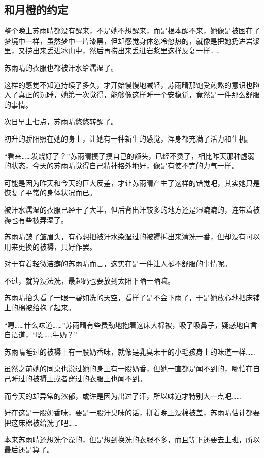 \subsection{和月橙的约定}

整个晚上苏雨晴都没有醒来，不是她不想醒来，而是根本醒不来，她像是被困在了梦境中一样，虽然梦中一片漆黑，但却感觉身体忽冷忽热的，就像是把她扔进岩浆里，又捞出来丢进冰山中，然后再捞出来丢进岩浆里这样反复一样……

苏雨晴的衣服也都被汗水给濡湿了。

这样的感觉不知道持续了多久，才开始慢慢地减轻，苏雨晴那饱受煎熬的意识也陷入了真正的沉睡，她第一次觉得，能够像这样睡一个安稳觉，竟然是一件那么舒服的事情。

次日早上七点，苏雨晴悠悠转醒了。

初升的骄阳照在她的身上，让她有一种新生的感觉，浑身都充满了活力和生机。

“看来……发烧好了？”苏雨晴摸了摸自己的额头，已经不烫了，相比昨天那种虚弱的状态，今天的苏雨晴觉得自己精神格外地好，像是有使不完的力气一样。

可能是因为昨天和今天的巨大反差，才让苏雨晴产生了这样的错觉吧，其实她只是恢复了平常的身体状况而已。

被汗水濡湿的衣服已经干了大半，但后背出汗较多的地方还是湿漉漉的，连带着被褥也有些被弄湿了。

苏雨晴皱了皱眉头，有心想把被汗水染湿过的被褥拆出来清洗一番，但却没有可以用来更换的被褥，只好作罢。

对于有着轻微洁癖的苏雨晴而言，这实在是一件让人挺不舒服的事情呢。

不过，就算没法洗，最起码也要放到太阳下晒一晒嘛。

苏雨晴抬头看了一眼一碧如洗的天空，看样子是不会下雨了，于是她放心地把床铺上的棉被给抱了起来。

“嗯……什么味道……”苏雨晴有些费劲地抱着这床大棉被，吸了吸鼻子，疑惑地自言自语道，“嗯……牛奶？”

苏雨晴睡过的被褥上有一股奶香味，就像是乳臭未干的小毛孩身上的味道一样……

虽然之前她的同桌也说过她的身上有一股奶香，但她一直都是闻不到的，哪怕在自己睡过的被褥上或者穿过的衣服上也闻不到。

而今天的却异常的浓郁，或许是因为出过了汗，所以味道才特别大一点吧……

好在这是一股奶香味，要是一股汗臭味的话，拼着晚上没棉被盖，苏雨晴估计都要把这床棉被给洗了吧……

本来苏雨晴还想洗个澡的，但是想到换洗的衣服不多，而且等下还要去上班，所以最后还是算了。

